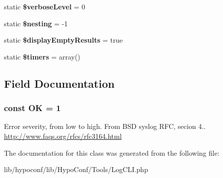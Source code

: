 \begin{DoxyCompactItemize}
\item 
\hypertarget{class_tools_1_1_log_c_l_i_ac9347966d13b8189e4c2674ef374e33c}{
static {\bfseries \$verbose\-Level} = 0}
\label{class_tools_1_1_log_c_l_i_ac9347966d13b8189e4c2674ef374e33c}

\item 
\hypertarget{class_tools_1_1_log_c_l_i_a5a1c55cd90727474457518a67f360315}{
static {\bfseries \$nesting} = -\/1}
\label{class_tools_1_1_log_c_l_i_a5a1c55cd90727474457518a67f360315}

\item 
\hypertarget{class_tools_1_1_log_c_l_i_ac089960bc304233f123f82776d77c804}{
static {\bfseries \$display\-Empty\-Results} = true}
\label{class_tools_1_1_log_c_l_i_ac089960bc304233f123f82776d77c804}

\item 
\hypertarget{class_tools_1_1_log_c_l_i_a5f7b761cc266f5087649a75ea2f2c5a9}{
static {\bfseries \$timers} = array()}
\label{class_tools_1_1_log_c_l_i_a5f7b761cc266f5087649a75ea2f2c5a9}

\end{DoxyCompactItemize}


\subsection{\-Field \-Documentation}
\hypertarget{class_tools_1_1_log_c_l_i_a662f51c007afab9ac309d177745a503f}{
\subsubsection[{\-O\-K}]{\setlength{\rightskip}{0pt plus 5cm}const {\bf \-O\-K} = 1}}
\label{class_tools_1_1_log_c_l_i_a662f51c007afab9ac309d177745a503f}
\-Error severity, from low to high. \-From \-B\-S\-D syslog \-R\-F\-C, secion 4.. \hyperlink{}{http\-://www.\-faqs.\-org/rfcs/rfc3164.\-html}

\-The documentation for this class was generated from the following file\-:\begin{DoxyCompactItemize}
\item 
lib/hypoconf/lib/\-Hypo\-Conf/\-Tools/\-Log\-C\-L\-I.\-php\end{DoxyCompactItemize}
